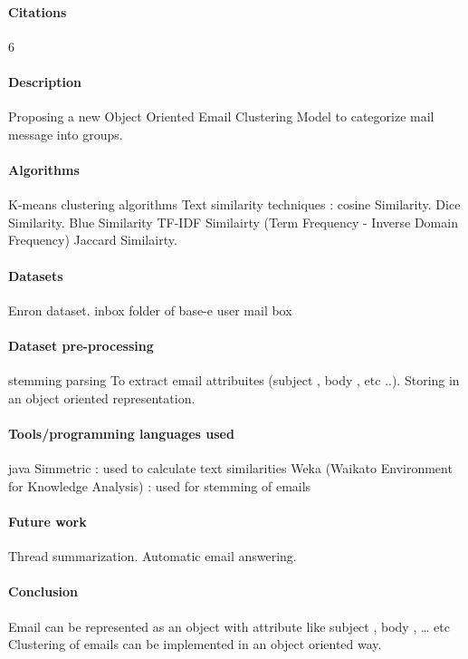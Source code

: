 \documentclass[12pt]{article}
\begin{document}
\paragraph{Citations}6
\paragraph{Description}
Proposing a new Object Oriented Email Clustering Model to categorize mail message into groups.

\paragraph{Algorithms}
K-means clustering algorithms
Text similarity techniques :
cosine Similarity.
Dice Similarity.
Blue Similarity
TF-IDF Similairty (Term Frequency - Inverse Domain Frequency)
Jaccard Similairty.

\paragraph{Datasets}
Enron dataset.
inbox folder of base-e user mail box

\paragraph{Dataset pre-processing}
stemming
parsing
To extract email attribuites (subject , body , etc ..).
Storing in an object oriented representation.

\paragraph{Tools/programming languages used}
java
Simmetric : used to calculate text similarities
Weka (Waikato Environment for Knowledge Analysis) : used for stemming of emails

\paragraph{Future work}
Thread summarization.
Automatic email answering.

\paragraph{Conclusion}
Email can be represented as an object with attribute like subject , body , … etc
Clustering of emails can be implemented in an object oriented way.
\end{document}
